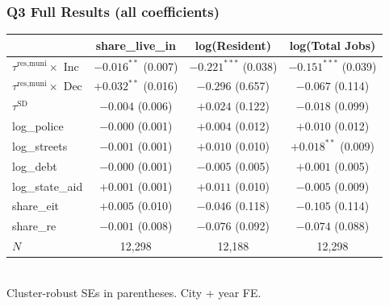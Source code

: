 \documentclass[xcolor = x11names, compress, aspectratio = 169]{beamer}
\renewcommand{\(}{\begin{columns}}
\renewcommand{\)}{\end{columns}}
\newcommand{\<}[1]{\begin{column}{#1}}
\renewcommand{\>}{\end{column}}
\begin{document}
\begin{frame}
\frametitle{Q3 Full Results (all coefficients)}
    \centering
    \scriptsize
    \renewcommand{\arraystretch}{1.15}
    \setlength{\tabcolsep}{6pt}
    \begin{tabular}{lccc}
        \toprule
        & share\_live\_in & log(Resident) & log(Total Jobs) \\
        \midrule
        $\tau^{\text{res,muni}} \times $ Inc  & $-0.016^{**}$ (0.007) & $-0.221^{***}$ (0.038) & $-0.151^{***}$ (0.039) \\
        $\tau^{\text{res,muni}} \times $ Dec  & $+0.032^{**}$ (0.016) & $-0.296$ (0.657)        & $-0.067$ (0.114) \\
        $\tau^{\text{SD}}$                     & $-0.004$ (0.006)      & $+0.024$ (0.122)        & $-0.018$ (0.099) \\
        \midrule
        log\_police       & $-0.000$ (0.001)  & $+0.004$ (0.012)       & $+0.010$ (0.012) \\
        log\_streets      & $-0.001$ (0.001)  & $+0.010$ (0.010)       & $+0.018^{**}$ (0.009) \\
        log\_debt         & $-0.000$ (0.001)  & $-0.005$ (0.005)       & $+0.001$ (0.005) \\
        log\_state\_aid   & $+0.001$ (0.001)  & $+0.011$ (0.010)       & $-0.005$ (0.009) \\
        share\_eit        & $+0.005$ (0.010)  & $-0.046$ (0.118)       & $-0.105$ (0.114) \\
        share\_re         & $-0.001$ (0.008)  & $-0.076$ (0.092)       & $-0.074$ (0.088) \\
        \midrule
        $N$               & 12{,}298 & 12{,}188 & 12{,}298 \\
        \bottomrule
    \end{tabular}
    \vspace{0.1cm} \\
    \scriptsize Cluster-robust SEs in parentheses. City + year FE.
\end{frame}
\end{document}
